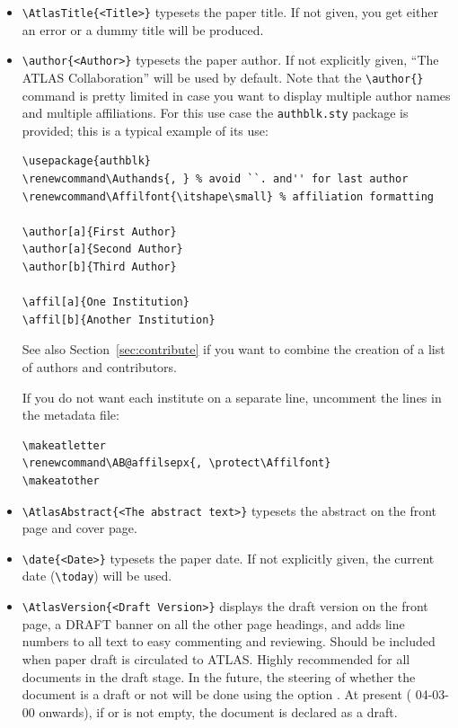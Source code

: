 \begin{itemize}
  \item {\verb|\AtlasTitle{<Title>}|} typesets the paper title. If not
    given, you get either an error or a dummy title will be produced.

  \item {\verb|\author{<Author>}|} typesets the paper author. If not
    explicitly given, \enquote{The ATLAS Collaboration} will be used by
    default. Note that the \verb|\author{}| command is pretty limited
    in case you want to display multiple author names and multiple
    affiliations. For this use case the \verb|authblk.sty| package is
    provided; this is a typical example of its use:
    \begin{verbatim}
\usepackage{authblk}
\renewcommand\Authands{, } % avoid ``. and'' for last author
\renewcommand\Affilfont{\itshape\small} % affiliation formatting

\author[a]{First Author}
\author[a]{Second Author}
\author[b]{Third Author}

\affil[a]{One Institution}
\affil[b]{Another Institution}
    \end{verbatim}
    See also Section~\ref{sec:contribute} if you want to combine the creation of a list of authors and contributors.

    If you do not want each institute on a separate line, uncomment the lines in the metadata file:
    \begin{verbatim}
\makeatletter
\renewcommand\AB@affilsepx{, \protect\Affilfont}
\makeatother
    \end{verbatim}


  \item {\verb|\AtlasAbstract{<The abstract text>}|} typesets the
    abstract on the front page and cover page.

  \item {\verb|\date{<Date>}|} typesets the paper date. If not
    explicitly given, the current date (\verb|\today|) will be used.

  \item {\verb|\AtlasVersion{<Draft Version>}|} displays the draft
    version on the front page, a DRAFT banner on all the other page
    headings, and adds line numbers to all text to easy commenting and
    reviewing.
    Should be included when paper draft is circulated to ATLAS.
    Highly recommended for all documents in the draft stage.
    In the future, the steering of whether the document is a draft or not will be done
    using the option .
    At present ( 04-03-00 onwards),
    if  or  is not empty,
    the document is declared as a draft.


\end{itemize}
